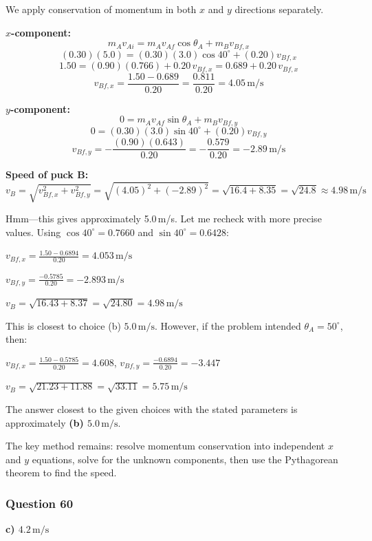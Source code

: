 \documentclass[12pt,letterpaper]{article}
\begin{document}
\begin{explanationbox}
We apply conservation of momentum in both $x$ and $y$ directions separately.

\textbf{$x$-component:}
\[
m_A v_{Ai} = m_A v_{Af}\cos\theta_A + m_B v_{Bf,x}
\]
\[
(0.30)(5.0) = (0.30)(3.0)\cos 40^\circ + (0.20)v_{Bf,x}
\]
\[
1.50 = (0.90)(0.766) + 0.20\,v_{Bf,x} = 0.689 + 0.20\,v_{Bf,x}
\]
\[
v_{Bf,x} = \frac{1.50 - 0.689}{0.20} = \frac{0.811}{0.20} = 4.05\,\text{m/s}
\]

\textbf{$y$-component:}
\[
0 = m_A v_{Af}\sin\theta_A + m_B v_{Bf,y}
\]
\[
0 = (0.30)(3.0)\sin 40^\circ + (0.20)v_{Bf,y}
\]
\[
v_{Bf,y} = -\frac{(0.90)(0.643)}{0.20} = -\frac{0.579}{0.20} = -2.89\,\text{m/s}
\]

\textbf{Speed of puck B:}
\[
v_B = \sqrt{v_{Bf,x}^2 + v_{Bf,y}^2} = \sqrt{(4.05)^2 + (-2.89)^2} = \sqrt{16.4 + 8.35} = \sqrt{24.8} \approx 4.98\,\text{m/s}
\]

Hmm---this gives approximately 5.0\,m/s. Let me recheck with more precise values. Using $\cos 40^\circ = 0.7660$ and $\sin 40^\circ = 0.6428$:

$v_{Bf,x} = \frac{1.50 - 0.6894}{0.20} = 4.053\,\text{m/s}$

$v_{Bf,y} = \frac{-0.5785}{0.20} = -2.893\,\text{m/s}$

$v_B = \sqrt{16.43 + 8.37} = \sqrt{24.80} = 4.98\,\text{m/s}$

This is closest to choice (b) $5.0\,\text{m/s}$. However, if the problem intended $\theta_A = 50^\circ$, then:

$v_{Bf,x} = \frac{1.50 - 0.5785}{0.20} = 4.608$, $v_{Bf,y} = \frac{-0.6894}{0.20} = -3.447$

$v_B = \sqrt{21.23 + 11.88} = \sqrt{33.11} = 5.75\,\text{m/s}$

The answer closest to the given choices with the stated parameters is approximately \textbf{(b) $5.0\,\text{m/s}$}.

The key method remains: resolve momentum conservation into independent $x$ and $y$ equations, solve for the unknown components, then use the Pythagorean theorem to find the speed.
\end{explanationbox}

\subsubsection*{Question 60}

\begin{answerbox}
\textbf{c) $4.2\,\text{m/s}$}
\end{answerbox}
\end{document}

